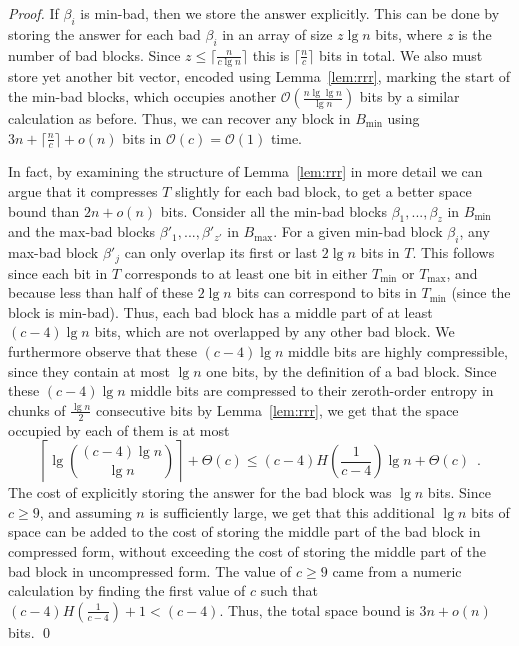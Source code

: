 \documentclass[runningheads]{llncs}
\newcommand{\Oh}{\mathcal{O}}
\begin{document}
\begin{proof}
If $\beta_i$ is min-bad, then we store the answer explicitly.  This
can be done by storing the answer for each bad $\beta_i$ in an array
of size $z \lg n$ bits, where $z$ is the number of bad blocks.  Since
$z \le \lceil \frac{n}{c \lg n} \rceil $ this is $\lceil \frac{n}{c}
\rceil $ bits in total.  We also must store yet another bit vector,
encoded using Lemma~\ref{lem:rrr}, marking the start of the min-bad
blocks, which occupies another $\Oh(\frac{n \lg \lg n}{\lg n})$ bits
by a similar calculation as before.  Thus, we can recover any block in
$B_{\min}$ using $3n + \lceil \frac{n}{c}\rceil + o(n)$ bits in
$\Oh(c) = \Oh(1)$ time.  

In fact, by examining the structure of Lemma~\ref{lem:rrr} in more
detail we can argue that it compresses $T$ slightly for each bad
block, to get a better space bound than $2n+o(n)$ bits. Consider all
the min-bad blocks $\beta_1, ..., \beta_z$ in $B_{\min}$ and the
max-bad blocks $\beta'_1, ..., \beta'_{z'}$ in $B_{\max}$.  For a
given min-bad block $\beta_i$, any max-bad block $\beta'_j$ can only
overlap its first or last $2 \lg n$ bits in $T$.  This follows since
each bit in $T$ corresponds to at least one bit in either $T_{\min}$
or $T_{\max}$, and because less than half of these $2\lg n$ bits can
correspond to bits in $T_{\min}$ (since the block is min-bad). Thus,
each bad block has a middle part of at least $(c-4)\lg n$ bits, which
are not overlapped by any other bad block.  We furthermore observe
that these $(c-4)\lg n$ middle bits are highly compressible, since
they contain at most $\lg n$ one bits, by the definition of a bad
block.  Since these $(c-4)\lg n$ middle bits are compressed to their
zeroth-order entropy in chunks of $\frac{\lg n}{2}$ consecutive bits
by Lemma~\ref{lem:rrr}, we get that the space occupied by each of them
is at most
$$\left\lceil \lg \binom{(c-4)\lg n}{\lg n} \right\rceil + \Theta(c)
\le (c-4)H\left(\frac{1}{c-4}\right) \lg n + \Theta(c) \enspace.$$ 
\noindent
The cost of explicitly storing the answer for the bad block was $\lg
n$ bits. Since $c \ge 9$, and assuming $n$ is sufficiently large, we
get that this additional $\lg n$ bits of space can be added to the
cost of storing the middle part of the bad block in compressed form,
without exceeding the cost of storing the middle part of the bad block
in uncompressed form.  The value of $c \ge 9$ came from a numeric
calculation by finding the first value of $c$ such that
$(c-4)H(\frac{1}{c-4}) + 1 < (c-4)$.  Thus, the total space bound is
$3n+o(n)$ bits.  \qed
\end{proof}
\end{document}
